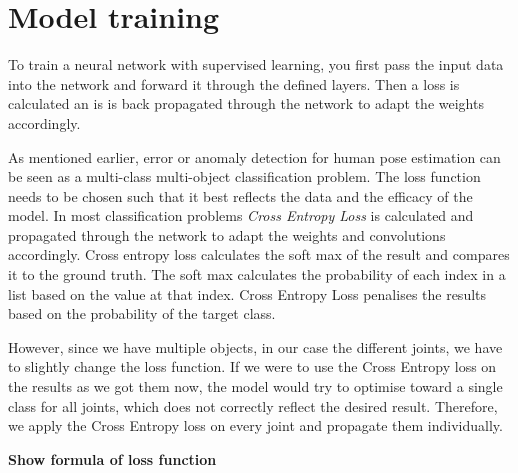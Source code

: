 \section{Model training}
\label{sec:model_training}

To train a neural network with supervised learning, you first pass the input data into the network and forward it through the defined layers. Then a loss is calculated an is is back propagated through the network to adapt the weights accordingly. 

As mentioned earlier, error or anomaly detection for human pose estimation can be seen as a multi-class multi-object classification problem. The loss function needs to be chosen such that it best reflects the data and the efficacy of the model. In most classification problems \textit{Cross Entropy Loss} is calculated and propagated through the network to adapt the weights and convolutions accordingly. Cross entropy loss calculates the soft max of the result and compares it to the ground truth. The soft max calculates the probability of each index in a list based on the value at that index. Cross Entropy Loss penalises the results based on the probability of the target class.

However, since we have multiple objects, in our case the different joints, we have to slightly change the loss function. If we were to use the Cross Entropy loss on the results as we got them now, the model would try to optimise toward a single class for all joints, which does not correctly reflect the desired result. Therefore, we apply the Cross Entropy loss on every joint and propagate them individually.

\textbf{Show formula of loss function}

